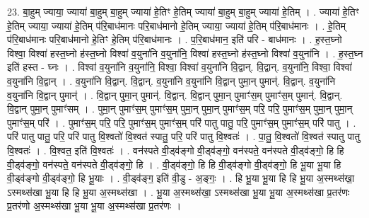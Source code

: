 \documentclass[17pt]{extarticle}
\begin{document}
23. बा॒हुम् ज्याया॒ ज्याया॑ बा॒हुम् बा॒हुम् ज्याया॑ हे॒तिꣳ हे॒तिम् ज्याया॑ बा॒हुम् बा॒हुम् ज्याया॑ हे॒तिम् । . ज्याया॑ हे॒तिꣳ हे॒तिम् ज्याया॒ ज्याया॑ हे॒तिम् प॑रि॒बाध॑मानः परि॒बाध॑मानो हे॒तिम् ज्याया॒ ज्याया॑ हे॒तिम् प॑रि॒बाध॑मानः । . हे॒तिम् प॑रि॒बाध॑मानः परि॒बाध॑मानो हे॒तिꣳ हे॒तिम् प॑रि॒बाध॑मानः । . प॒रि॒बाध॑मान॒ इति॑ परि - बाध॑मानः । . ह॒स्त॒घ्नो विश्वा॒ विश्वा॑ हस्त॒घ्नो ह॑स्त॒घ्नो विश्वा॑ व॒युना॑नि व॒युना॑नि॒ विश्वा॑ हस्त॒घ्नो ह॑स्त॒घ्नो विश्वा॑ व॒युना॑नि । . ह॒स्त॒घ्न इति॑ हस्त - घ्नः । . विश्वा॑ व॒युना॑नि व॒युना॑नि॒ विश्वा॒ विश्वा॑ व॒युना॑नि वि॒द्वान्. वि॒द्वान्. व॒युना॑नि॒ विश्वा॒ विश्वा॑ व॒युना॑नि वि॒द्वान् । . व॒युना॑नि वि॒द्वान्. वि॒द्वान्. व॒युना॑नि व॒युना॑नि वि॒द्वान् पुमा॒न् पुमान्॑. वि॒द्वान्. व॒युना॑नि व॒युना॑नि वि॒द्वान् पुमान्॑ । . वि॒द्वान् पुमा॒न् पुमान्॑. वि॒द्वान्. वि॒द्वान् पुमा॒न् पुमाꣳ॑स॒म् पुमाꣳ॑स॒म् पुमान्॑. वि॒द्वान्. वि॒द्वान् पुमा॒न् पुमाꣳ॑सम् । . पुमा॒न् पुमाꣳ॑स॒म् पुमाꣳ॑स॒म् पुमा॒न् पुमा॒न् पुमाꣳ॑स॒म् परि॒ परि॒ पुमाꣳ॑स॒म् पुमा॒न् पुमा॒न् पुमाꣳ॑स॒म् परि॑ । . पुमाꣳ॑स॒म् परि॒ परि॒ पुमाꣳ॑स॒म् पुमाꣳ॑स॒म् परि॑ पातु पातु॒ परि॒ पुमाꣳ॑स॒म् पुमाꣳ॑स॒म् परि॑ पातु । . परि॑ पातु पातु॒ परि॒ परि॑ पातु वि॒श्वतो॑ वि॒श्वत॑ स्पातु॒ परि॒ परि॑ पातु वि॒श्वतः॑ । . पा॒तु॒ वि॒श्वतो॑ वि॒श्वत॑ स्पातु पातु वि॒श्वतः॑ । . वि॒श्वत॒ इति॑ वि॒श्वतः॑ । . वन॑स्पते वी॒ड्व॑ङ्गो वी॒ड्व॑ङ्गो॒ वन॑स्पते॒ वन॑स्पते वी॒ड्व॑ङ्गो॒ हि हि वी॒ड्व॑ङ्गो॒ वन॑स्पते॒ वन॑स्पते वी॒ड्व॑ङ्गो॒ हि । . वी॒ड्व॑ङ्गो॒ हि हि वी॒ड्व॑ङ्गो वी॒ड्व॑ङ्गो॒ हि भू॒या भू॒या हि वी॒ड्व॑ङ्गो वी॒ड्व॑ङ्गो॒ हि भू॒याः । . वी॒ड्व॑ङ्ग॒ इति॑ वी॒डु - अ॒ङ्गः॒ । . हि भू॒या भू॒या हि हि भू॒या अ॒स्मथ्स॑खा॒ ऽस्मथ्स॑खा भू॒या हि हि भू॒या अ॒स्मथ्स॑खा । . भू॒या अ॒स्मथ्स॑खा॒ ऽस्मथ्स॑खा भू॒या भू॒या अ॒स्मथ्स॑खा प्र॒तर॑णः प्र॒तर॑णो अ॒स्मथ्स॑खा भू॒या भू॒या अ॒स्मथ्स॑खा प्र॒तर॑णः । \newline
\end{document}
